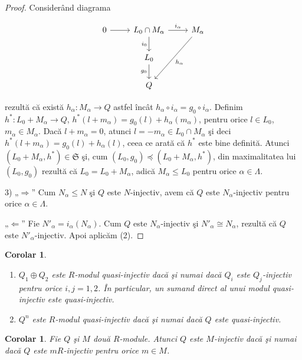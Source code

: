 \documentclass[12pt,a4paper]{book}
\theoremstyle{plain}
\newtheorem{corollary}[theorem]{Corolar}
\theoremstyle{definition}
\theoremstyle{remark}
\begin{document}
\begin{proof}
Considerând diagrama

\[
\begin{tikzcd}
0 \arrow[r] &
L_0 \cap M_\alpha \arrow[r,"i_\alpha"] \arrow[d,"i_0"'] &
M_\alpha \arrow[ddl,"h_\alpha"] \\
& L_0 \arrow[d,"g_0"'] & \\
& Q &
\end{tikzcd}
\]

rezultă că există \(h_\alpha : M_\alpha \to Q\) astfel încât
\(h_\alpha \circ i_\alpha = g_0 \circ i_\alpha\).
Definim
\(h^{*} : L_0 + M_\alpha \to Q\),
\(h^{*}(l + m_\alpha) = g_0(l) + h_\alpha(m_\alpha)\),
pentru orice \(l \in L_0\), \(m_\alpha \in M_\alpha\).
Dacă \(l + m_\alpha = 0\), atunci \(l = -m_\alpha \in L_0 \cap M_\alpha\) şi deci
\(h^{*}(l + m_\alpha) = g_0(l) + h_\alpha(l)\), ceea ce arată că \(h^{*}\) este bine definită.
Atunci \((L_0 + M_\alpha, h^{*}) \in \mathfrak{S}\) şi, cum
\((L_0,g_0) \preccurlyeq (L_0 + M_\alpha, h^{*})\),
din maximalitatea lui \((L_0,g_0)\) rezultă că
\(L_0 = L_0 + M_\alpha\), adică \(M_\alpha \le L_0\) pentru orice \(\alpha \in \Lambda\).

3) „\(\Rightarrow\)” Cum \(N_\alpha \le N\) şi \(Q\) este \(N\)-injectiv,
avem că \(Q\) este \(N_\alpha\)-injectiv pentru orice \(\alpha \in \Lambda\).

„\(\Leftarrow\)” Fie \(N'_\alpha = i_\alpha(N_\alpha)\).
Cum \(Q\) este \(N_\alpha\)-injectiv şi \(N'_\alpha \cong N_\alpha\),
rezultă că \(Q\) este \(N'_\alpha\)-injectiv.
Apoi aplicăm (2).
\end{proof}


\begin{corollary}
\leavevmode
\begin{enumerate}
  \item \(Q_1 \oplus Q_2\) este \(R\)-modul quasi-injectiv dacă şi numai dacă
        \(Q_i\) este \(Q_j\)-injectiv pentru orice \(i,j = 1,2\).
        În particular, un sumand direct al unui modul quasi-injectiv este quasi-injectiv.
  \item \(Q^{n}\) este \(R\)-modul quasi-injectiv dacă şi numai dacă
        \(Q\) este quasi-injectiv.
\end{enumerate}
\end{corollary}

\begin{corollary}
Fie \(Q\) şi \(M\) două \(R\)-module. Atunci \(Q\) este \(M\)-injectiv
dacă şi numai dacă \(Q\) este \(mR\)-injectiv pentru orice \(m \in M\).
\end{corollary}
\end{document}
